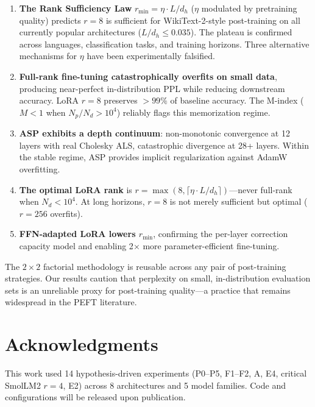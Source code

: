 \documentclass[11pt]{article}
\begin{document}
\begin{enumerate}[leftmargin=*]
\item \textbf{The Rank Sufficiency Law} $r_{\min} = \eta \cdot L/d_h$ ($\eta$ modulated by pretraining quality) predicts $r=8$ is sufficient for WikiText-2-style post-training on all currently popular architectures ($L/d_h \leq 0.035$). The plateau is confirmed across languages, classification tasks, and training horizons. Three alternative mechanisms for $\eta$ have been experimentally falsified.

\item \textbf{Full-rank fine-tuning catastrophically overfits on small data}, producing near-perfect in-distribution PPL while reducing downstream accuracy. LoRA $r=8$ preserves $>99\%$ of baseline accuracy. The M-index ($M < 1$ when $N_p/N_d > 10^4$) reliably flags this memorization regime.

\item \textbf{ASP exhibits a depth continuum}: non-monotonic convergence at 12 layers with real Cholesky ALS, catastrophic divergence at 28+ layers. Within the stable regime, ASP provides implicit regularization against AdamW overfitting.

\item \textbf{The optimal LoRA rank} is $r = \max(8, \lceil \eta \cdot L/d_h \rceil)$---never full-rank when $N_d < 10^4$. At long horizons, $r=8$ is not merely sufficient but optimal ($r=256$ overfits).

\item \textbf{FFN-adapted LoRA lowers $r_{\min}$}, confirming the per-layer correction capacity model and enabling 2$\times$ more parameter-efficient fine-tuning.
\end{enumerate}

The $2\times2$ factorial methodology is reusable across any pair of post-training strategies. Our results caution that perplexity on small, in-distribution evaluation sets is an unreliable proxy for post-training quality---a practice that remains widespread in the PEFT literature.

\section*{Acknowledgments}

This work used 14 hypothesis-driven experiments (P0--P5, F1--F2, A, E4, critical SmolLM2 $r=4$, E2) across 8 architectures and 5 model families. Code and configurations will be released upon publication.
\end{document}
